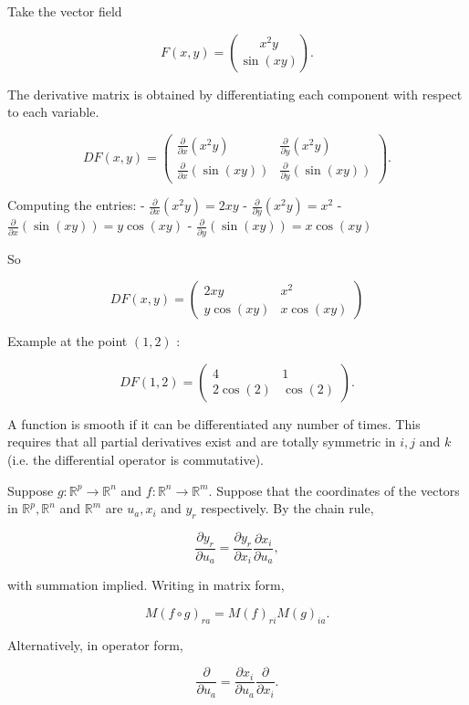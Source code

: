\begin{nex}
	Take the vector field
	
	$$
	F(x, y)=\binom{x^2 y}{\sin (x y)} .
	$$
	
	
	The derivative matrix is obtained by differentiating each component with respect to each variable.
	
	$$
	D F(x, y)=\left(\begin{array}{cc}
		\frac{\partial}{\partial x}\left(x^2 y\right) & \frac{\partial}{\partial y}\left(x^2 y\right) \\
		\frac{\partial}{\partial x}(\sin (x y)) & \frac{\partial}{\partial y}(\sin (x y))
	\end{array}\right) .
	$$
	
	
	Computing the entries:
	- $\frac{\partial}{\partial x}\left(x^2 y\right)=2 x y$
	- $\frac{\partial}{\partial y}\left(x^2 y\right)=x^2$
	- $\frac{\partial}{\partial x}(\sin (x y))=y \cos (x y)$
	- $\frac{\partial}{\partial y}(\sin (x y))=x \cos (x y)$
	
	So
	
	$$
	D F(x, y)=\left(\begin{array}{cc}
		2 x y & x^2 \\
		y \cos (x y) & x \cos (x y)
	\end{array}\right)
	$$
	
	
	Example at the point $(1,2)$ :
	
	$$
	D F(1,2)=\left(\begin{array}{cc}
		4 & 1 \\
		2 \cos (2) & \cos (2)
	\end{array}\right) .
	$$
\end{nex}

\begin{ndefi}
	
	A function is smooth if it can be differentiated any number of times. This requires that all partial derivatives exist and are totally symmetric in $i, j$ and $k$ (i.e. the differential operator is commutative).
	
\end{ndefi}

\begin{nthm}
	Suppose $g: \mathbb{R}^p \rightarrow \mathbb{R}^n$ and $f: \mathbb{R}^n \rightarrow \mathbb{R}^m$. Suppose that the coordinates of the vectors in $\mathbb{R}^p, \mathbb{R}^n$ and $\mathbb{R}^m$ are $u_a, x_i$ and $y_r$ respectively. By the chain rule,
	
	$$
	\frac{\partial y_r}{\partial u_a}=\frac{\partial y_r}{\partial x_i} \frac{\partial x_i}{\partial u_a},
	$$
	
	with summation implied. Writing in matrix form,
	
	$$
	M(f \circ g)_{r a}=M(f)_{r i} M(g)_{i a} .
	$$
	
	
	Alternatively, in operator form,
	
	$$
	\frac{\partial}{\partial u_a}=\frac{\partial x_i}{\partial u_a} \frac{\partial}{\partial x_i} .
	$$
\end{nthm}

